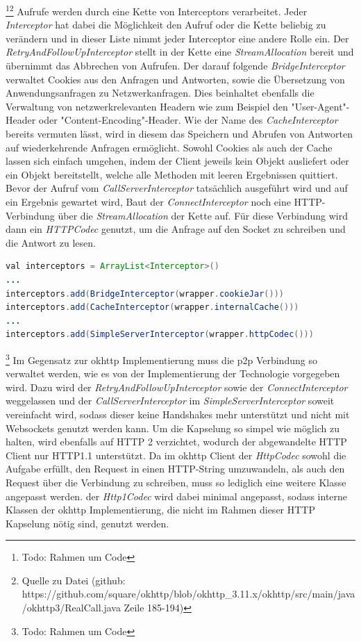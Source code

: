 \documentclass[12pt,a4paper]{article}
\begin{document}
        \footnote{Todo: Rahmen um Code}\footnote{Quelle zu Datei (github: https://github.com/square/okhttp/blob/okhttp\_3.11.x/okhttp/src/main/java/okhttp3/RealCall.java Zeile 185-194)} Aufrufe werden durch eine Kette von Interceptors verarbeitet. Jeder {\it Interceptor} hat dabei die Möglichkeit den Aufruf oder die Kette beliebig zu verändern und in dieser Liste nimmt jeder Interceptor eine andere Rolle ein. Der {\it RetryAndFollowUpInterceptor} stellt in der Kette eine {\it StreamAllocation} bereit und übernimmt das Abbrechen von Aufrufen. Der darauf folgende {\it BridgeInterceptor} verwaltet Cookies aus den Anfragen und Antworten, sowie die Übersetzung von Anwendungsanfragen zu Netzwerkanfragen. Dies beinhaltet ebenfalls die Verwaltung von netzwerkrelevanten Headern wie zum Beispiel den "User-Agent"-Header oder "Content-Encoding"-Header. Wie der Name des {\it CacheInterceptor} bereits vermuten lässt, wird in diesem das Speichern und Abrufen von Antworten auf wiederkehrende Anfragen ermöglicht. Sowohl Cookies als auch der Cache lassen sich einfach umgehen, indem der Client jeweils kein Objekt ausliefert oder ein Objekt bereitstellt, welche alle Methoden mit leeren Ergebnissen quittiert. Bevor der Aufruf vom {\it CallServerInterceptor} tatsächlich ausgeführt wird und auf ein Ergebnis gewartet wird, Baut der {\it ConnectInterceptor} noch eine HTTP-Verbindung über die {\it StreamAllocation} der Kette auf. Für diese Verbindung wird dann ein {\it HTTPCodec} genutzt, um die Anfrage auf den Socket zu schreiben und die Antwort zu lesen.
        
        \begin{lstlisting}[language=Java, caption=Änderungen an okhttp (Client: Kotlin)]
val interceptors = ArrayList<Interceptor>()
...
interceptors.add(BridgeInterceptor(wrapper.cookieJar()))
interceptors.add(CacheInterceptor(wrapper.internalCache()))
...
interceptors.add(SimpleServerInterceptor(wrapper.httpCodec()))
        \end{lstlisting}
        \footnote{Todo: Rahmen um Code} Im Gegensatz zur okhttp Implementierung muss die p2p Verbindung so verwaltet werden, wie es von der Implementierung der Technologie vorgegeben wird. Dazu wird der {\it RetryAndFollowUpInterceptor} sowie der {\it ConnectInterceptor} weggelassen und der {\it CallServerInterceptor} im {\it SimpleServerInterceptor} soweit vereinfacht wird, sodass dieser keine Handshakes mehr unterstützt und nicht mit Websockets genutzt werden kann.
        Um die Kapselung so simpel wie möglich zu halten, wird ebenfalls auf HTTP 2 verzichtet, wodurch der abgewandelte HTTP Client nur HTTP1.1 unterstützt. Da im okhttp Client der {\it HttpCodec} sowohl die Aufgabe erfüllt, den Request in einen HTTP-String umzuwandeln, als auch den Request über die Verbindung zu schreiben, muss so lediglich eine weitere Klasse angepasst werden. der {\it Http1Codec} wird dabei minimal angepasst, sodass interne Klassen der okhttp Implementierung, die nicht im Rahmen dieser HTTP Kapselung nötig sind, genutzt werden.
        
\end{document}
